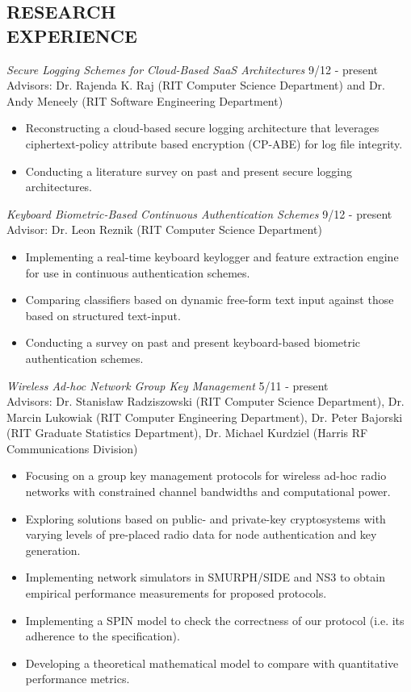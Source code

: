\documentclass[line,margin]{res}
\begin{document}
\begin{resume}
\section{RESEARCH\\EXPERIENCE}
	{\sl Secure Logging Schemes for Cloud-Based SaaS Architectures} \hfill   9/12 - present\\
	 Advisors: Dr. Rajenda K. Raj (RIT Computer Science Department) and Dr. Andy Meneely (RIT Software Engineering Department)
	\begin{itemize} \itemsep -2pt %
		\item Reconstructing a cloud-based secure logging architecture that leverages ciphertext-policy attribute based encryption (CP-ABE) for log file integrity.
		\item Conducting a literature survey on past and present secure logging architectures.
	\end{itemize}

	{\sl Keyboard Biometric-Based Continuous Authentication Schemes} \hfill   9/12 - present\\
	 Advisor: Dr. Leon Reznik (RIT Computer Science Department) 
	\begin{itemize} \itemsep -2pt %
		\item Implementing a real-time keyboard keylogger and feature extraction engine for use in continuous authentication schemes.
		\item Comparing classifiers based on dynamic free-form text input against those based on structured text-input.
		\item Conducting a survey on past and present keyboard-based biometric authentication schemes.
	\end{itemize}

	{\sl Wireless Ad-hoc Network Group Key Management} \hfill    5/11 - present\\
	Advisors: Dr. Stanis{\l}aw Radziszowski (RIT Computer Science Department), Dr. Marcin Lukowiak (RIT Computer Engineering Department), Dr. Peter Bajorski (RIT Graduate Statistics Department), Dr. Michael Kurdziel (Harris RF Communications Division)
	\begin{itemize} \itemsep -2pt %
	\item Focusing on a group key management protocols for wireless ad-hoc radio networks with constrained channel bandwidths and computational power.
	\item Exploring solutions based on public- and private-key cryptosystems with varying levels of pre-placed radio data for node authentication and key generation.
	\item Implementing network simulators in SMURPH/SIDE and NS3 to obtain empirical performance measurements for proposed protocols.
	\item Implementing a SPIN model to check the correctness of our protocol (i.e. its adherence to the specification).
	\item Developing a theoretical mathematical model to compare with quantitative performance metrics.
	\end{itemize}


\end{resume}
\end{document}
